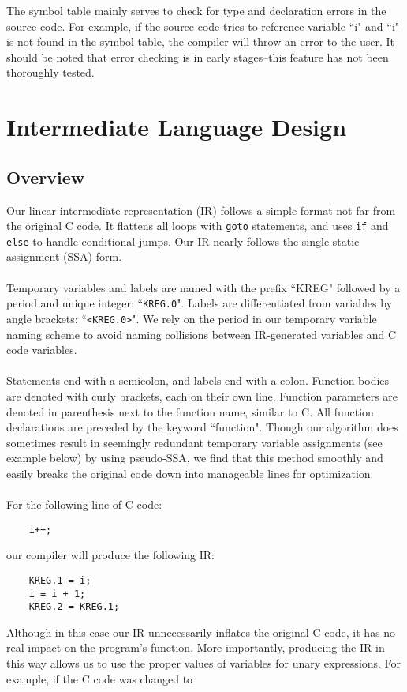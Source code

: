 \documentclass{scrartcl}
\begin{document}
The symbol table mainly serves to check for type and declaration errors in the source code. For example, if the source code tries to reference variable ``i" and ``i" is not found in the symbol table, the compiler will throw an error to the user. It should be noted that error checking is in early stages--this feature has not been thoroughly tested.

\section{Intermediate Language Design}
\subsection{Overview}
Our linear intermediate representation (IR) follows a simple format not far from the original C code. It flattens all loops with \verb|goto| statements, and uses \verb|if| and \verb|else| to handle conditional jumps. Our IR nearly follows the single static assignment (SSA) form.\\
\\
Temporary variables and labels are named with the prefix ``KREG" followed by a period and unique integer: ``\verb|KREG.0|". Labels are differentiated from variables by angle brackets: ``\verb|<KREG.0>|". We rely on the period in our temporary variable naming scheme to avoid naming collisions between IR-generated variables and C code variables.\\
\\
Statements end with a semicolon, and labels end with a colon. Function bodies are denoted with curly brackets, each on their own line. Function parameters are denoted in parenthesis next to the function name, similar to C. All function declarations are preceded by the keyword ``function".
Though our algorithm does sometimes result in seemingly redundant temporary variable assignments (see example below) by using pseudo-SSA, we find that this method smoothly and easily breaks the original code down into manageable lines for optimization.\\
\\
For the following line of C code:
\begin{verbatim}
    i++;
\end{verbatim}
our compiler will produce the following IR:
\begin{verbatim}
    KREG.1 = i;
    i = i + 1;
    KREG.2 = KREG.1;
\end{verbatim}
Although in this case our IR unnecessarily inflates the original C code, it has no real impact on the program's function. More importantly, producing the IR in this way allows us to use the proper values of variables for unary expressions. For example, if the C code was changed to
\end{document}
